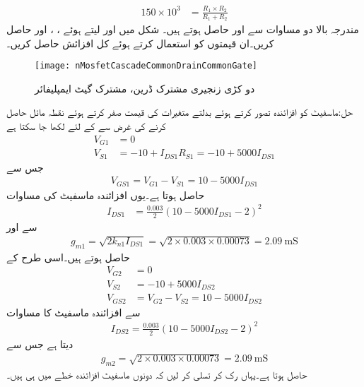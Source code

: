 \begin{align*}
150 \times 10^{3}&=\frac{R_1 \times R_2}{R_1+R_2}
\end{align*}
مندرجہ بالا دو مساوات سے  اور  حاصل ہوتے ہیں۔ 
شکل  میں  اور  لیتے ہوئے ، ،  اور  حاصل کریں۔ان قیمتوں کو استعمال کرتے ہوئے کل افزائش  حاصل کریں۔ 
\begin{figure}
\centering
\texttt{[image: nMosfetCascadeCommonDrainCommonGate]}
\caption{دو کڑی زنجیری مشترک ڈرین،  مشترک گیٹ ایمپلیفائر}
\label{شکل_ماسفیٹ_زنجیری_مشترک_محاصل_مشترک_گیٹ}
\end{figure}

حل:ماسفیٹ کو افزائندہ تصور کرتے ہوئے بدلتے متغیرات کی قیمت صفر کرتے ہوئے نقطہ مائل حاصل کرنے کی غرض سے  کے لئے لکھا جا سکتا ہے
\begin{align*}
V_{G1}&=0\\
V_{S1}&=-10+I_{DS1}R_{S1}=-10+5000 I_{DS1}
\end{align*}
جس سے
\begin{align*}
V_{GS1}=V_{G1}-V_{S1}=10-5000 I_{DS1}
\end{align*}
حاصل ہوتا ہے۔یوں افزائندہ ماسفیٹ کی مساوات
\begin{align*}
I_{DS1}&=\frac{0.003}{2} \left(10-5000 I_{DS1} -2 \right)^2
\end{align*}
سے  اور
\begin{align*}
g_{m1}=\sqrt{2 k_{n1} I_{DS1}}=\sqrt{2 \times 0.003 \times 0.00073}=\SI{2.09}{\milli \siemens}
\end{align*}
حاصل ہوتے ہیں۔اسی طرح  کے
\begin{align*}
V_{G2}&=0\\
V_{S2}&=-10+5000 I_{DS2}\\
V_{GS2}&=V_{G2}-V_{S2}=10-5000 I_{DS2}
\end{align*}
سے افزائندہ ماسفیٹ کا مساوات
\begin{align*}
I_{DS2}=\frac{0.003}{2} \left(10-5000 I_{DS2} -2\right)^2
\end{align*}
 دیتا ہے جس سے 
\begin{align*}
g_{m2}=\sqrt{ 2 \times 0.003 \times 0.00073}=\SI{2.09}{\milli \siemens}
\end{align*}
حاصل ہوتا ہے۔یہاں رک کر تسلی کر لیں کہ دونوں ماسفیٹ افزائندہ خطے میں ہی ہیں۔ 

